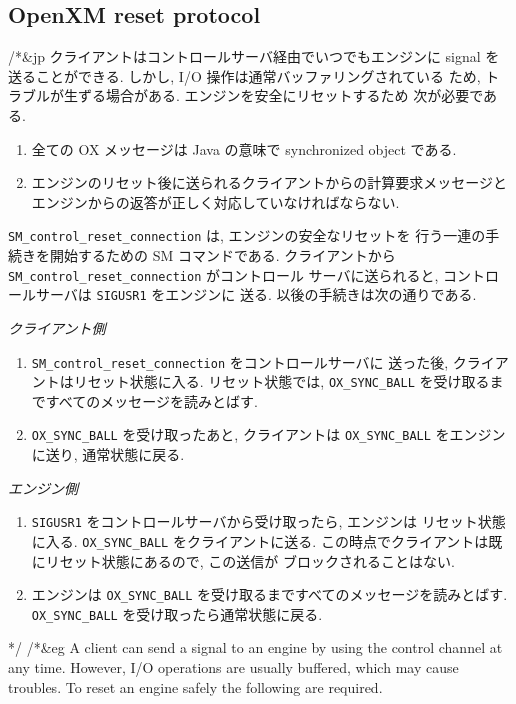 \subsection{OpenXM reset protocol}

/*&jp
クライアントはコントロールサーバ経由でいつでもエンジンに signal を
送ることができる. しかし, I/O 操作は通常バッファリングされている
ため, トラブルが生ずる場合がある. エンジンを安全にリセットするため
次が必要である. 

\begin{enumerate}
\item 全ての OX メッセージは Java の意味で synchronized object である. 

\item エンジンのリセット後に送られるクライアントからの計算要求メッセージと
エンジンからの返答が正しく対応していなければならない. 
\end{enumerate}

{\tt SM\_control\_reset\_connection} は, エンジンの安全なリセットを
行う一連の手続きを開始するための SM コマンドである. 
クライアントから {\tt SM\_control\_reset\_connection} がコントロール
サーバに送られると, コントロールサーバは {\tt SIGUSR1} をエンジンに
送る. 以後の手続きは次の通りである. 

\vskip 2mm
\noindent
{\it クライアント側} 
\begin{enumerate}
\item {\tt SM\_control\_reset\_connection} をコントロールサーバに
送った後, クライアントはリセット状態に入る. リセット状態では, 
{\tt OX\_SYNC\_BALL} を受け取るまですべてのメッセージを読みとばす. 
\item {\tt OX\_SYNC\_BALL} を受け取ったあと, クライアントは
{\tt OX\_SYNC\_BALL} をエンジンに送り, 通常状態に戻る. 
\end{enumerate}

\noindent
{\it エンジン側}
\begin{enumerate}
\item 
{\tt SIGUSR1} をコントロールサーバから受け取ったら, エンジンは
リセット状態に入る. {\tt OX\_SYNC\_BALL} をクライアントに送る. 
この時点でクライアントは既にリセット状態にあるので, この送信が
ブロックされることはない. 
\item エンジンは
{\tt OX\_SYNC\_BALL} を受け取るまですべてのメッセージを読みとばす. 
{\tt OX\_SYNC\_BALL} を受け取ったら通常状態に戻る. 
\end{enumerate}
*/
/*&eg
A client can send a signal to an engine by using the control channel 
at any time. However, I/O operations are usually buffered,
which may cause troubles.
To reset an engine safely the following are required.

